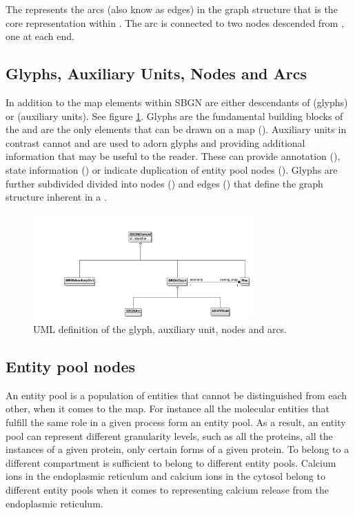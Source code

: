 The  represents the arcs (also know as edges) in
the graph structure that is the core representation within \PDl. The
arc is connected to two nodes descended from , one
at each end.


\subsection{Glyphs, Auxiliary Units, Nodes and Arcs}

In addition to the map elements within SBGN are either descendants of
 (glyphs) or 
(auxiliary units). See figure \ref{fig:glyphauxuml}. Glyphs are the
fundamental building blocks of the \PDl and are the only elements that
can be drawn on a map (). Auxiliary units in contrast
cannot and are used to adorn glyphs and providing additional
information that may be useful to the reader. These can provide
annotation (), state information
() or indicate duplication of entity pool nodes
().  Glyphs are further subdivided divided into nodes
() and edges () that define
the graph structure inherent in a \PDm.

\begin{figure}[h!]
  \centering
  \includegraphics[width=0.75\textwidth]{images/glyphauxuml}
\caption{UML definition of the glyph, auxiliary unit, nodes and arcs.}
  \label{fig:glyphauxuml}
\end{figure}


\subsection{Entity pool nodes}\label{sec:EPNs}

An entity pool is a population of entities that cannot be
distinguished from each other, when it comes to the \SBGNPDLone
map. For instance all the molecular entities that fulfill the same
role in a given process form an entity pool. As a result, an entity
pool can represent different granularity levels, such as all the
proteins, all the instances of a given protein, only certain forms of
a given protein. To belong to a different compartment is sufficient to
belong to different entity pools. Calcium ions in the endoplasmic
reticulum and calcium ions in the cytosol belong to different entity
pools when it comes to representing calcium release from the
endoplasmic reticulum.

